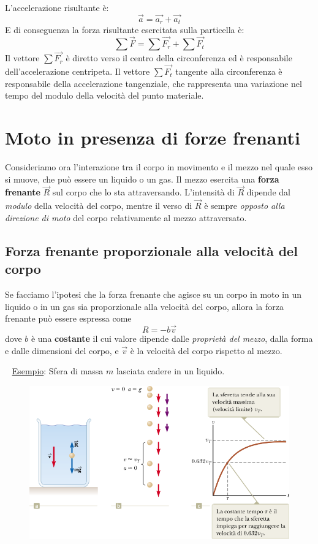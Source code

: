 \documentclass[a4paper,11pt,oneside]{book}
\begin{document}
\noindent L'accelerazione risultante è:
\begin{equation*}
    \vec{a} = \vec{a_r} + \vec{a_t}
\end{equation*}
E di conseguenza la forza risultante esercitata sulla particella è:
\begin{equation*}
    \sum \vec{F} = \sum \vec{F_r} + \sum \vec{F_t}
\end{equation*}
Il vettore $\sum \vec{F_r}$ è diretto verso il centro della circonferenza ed è responsabile dell’accelerazione centripeta. 
Il vettore $\sum \vec{F_t}$ tangente alla circonferenza è responsabile della accelerazione tangenziale, che rappresenta una variazione nel tempo del modulo 
della velocità del punto materiale.

\section{Moto in presenza di forze frenanti}
Consideriamo ora l'interazione tra il corpo in movimento e il mezzo nel quale esso si muove, che può essere un liquido o un gas. Il mezzo esercita una \textbf{forza frenante} $\vec{R}$ sul corpo che lo sta attraversando.
L’intensità di $\vec{R}$ dipende dal \emph{modulo} della velocità del corpo, mentre il verso di $\vec{R}$ è sempre \emph{opposto alla direzione di moto} del corpo relativamente al mezzo attraversato.

\subsection{Forza frenante proporzionale alla velocità del corpo}
Se facciamo l’ipotesi che la forza frenante che agisce su un corpo in moto in un liquido o in un gas sia proporzionale alla velocità del corpo, allora la forza frenante può essere espressa come
\begin{equation*}
    R = -b\vec{v}
\end{equation*}
dove $b$ è una \textbf{costante} il cui valore dipende dalle \emph{proprietà del mezzo}, dalla forma e dalle dimensioni del corpo, e $\vec{v}$ è la velocità del corpo rispetto al mezzo.

~\newline
\underline{Esempio}: Sfera di massa $m$ lasciata cadere in un liquido.
\begin{figure}[h]
    \centering
    \includegraphics[scale=0.4]{sfera_fluido.png}
\end{figure}
\end{document}
